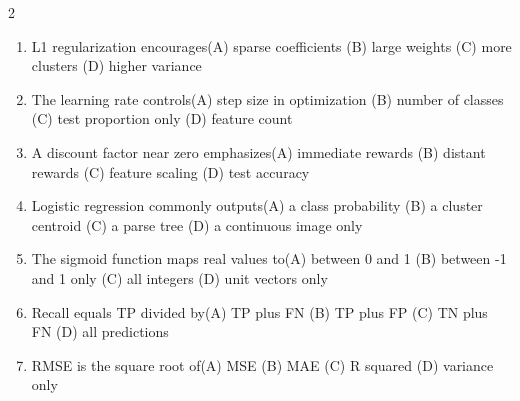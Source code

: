 \documentclass[a4paper]{article}
\begin{document}
\begin{multicols*}{2}
\begin{enumerate}
\item L1 regularization encourages\newline\hspace*{0.6em}(A) sparse coefficients \quad (B) large weights \newline\hspace*{0.6em}(C) more clusters \quad (D) higher variance
\item The learning rate controls\newline\hspace*{0.6em}(A) step size in optimization \quad (B) number of classes \newline\hspace*{0.6em}(C) test proportion only \quad (D) feature count
\item A discount factor near zero emphasizes\newline\hspace*{0.6em}(A) immediate rewards \quad (B) distant rewards \newline\hspace*{0.6em}(C) feature scaling \quad (D) test accuracy
\item Logistic regression commonly outputs\newline\hspace*{0.6em}(A) a class probability \quad (B) a cluster centroid \newline\hspace*{0.6em}(C) a parse tree \quad (D) a continuous image only
\item The sigmoid function maps real values to\newline\hspace*{0.6em}(A) between 0 and 1 \quad (B) between -1 and 1 only \newline\hspace*{0.6em}(C) all integers \quad (D) unit vectors only
\item Recall equals TP divided by\newline\hspace*{0.6em}(A) TP plus FN \quad (B) TP plus FP \newline\hspace*{0.6em}(C) TN plus FN \quad (D) all predictions
\item RMSE is the square root of\newline\hspace*{0.6em}(A) MSE \quad (B) MAE \newline\hspace*{0.6em}(C) R squared \quad (D) variance only

\end{enumerate}
\end{multicols*}
\end{document}
